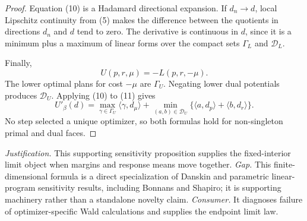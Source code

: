 \documentclass{article}
\begin{document}
\begin{proof}
Equation (10) is a Hadamard directional expansion.  If \(d_n\to d\), local Lipschitz continuity from (5) makes the difference between the quotients in directions \(d_n\) and \(d\) tend to zero.  The derivative is continuous in \(d\), since it is a minimum plus a maximum of linear forms over the compact sets \(\Gamma_L\) and \(\mathcal D_L\).

Finally,
\[
U(p,r,\mu)=-L(p,r,-\mu).
\tag{11}
\]
The lower optimal plans for cost \(-\mu\) are \(\Gamma_U\).  Negating lower dual potentials produces \(\mathcal D_U\).  Applying (10) to (11) gives
\[
U'_\beta(d)=
\max_{\gamma\in\Gamma_U}\langle\gamma,d_\mu\rangle
+\min_{(a,b)\in\mathcal D_U}
\{\langle a,d_p\rangle+\langle b,d_r\rangle\}.
\]
No step selected a unique optimizer, so both formulas hold for non-singleton primal and dual faces.
\end{proof}
\par\smallskip\noindent \textit{Justification.} This supporting sensitivity proposition supplies the fixed-interior limit object when margins and response means move together. \textit{Gap.} This finite-dimensional formula is a direct specialization of Danskin and parametric linear-program sensitivity results, including Bonnans and Shapiro; it is supporting machinery rather than a standalone novelty claim. \textit{Consumer.} It diagnoses failure of optimizer-specific Wald calculations and supplies the endpoint limit law.
\end{document}

